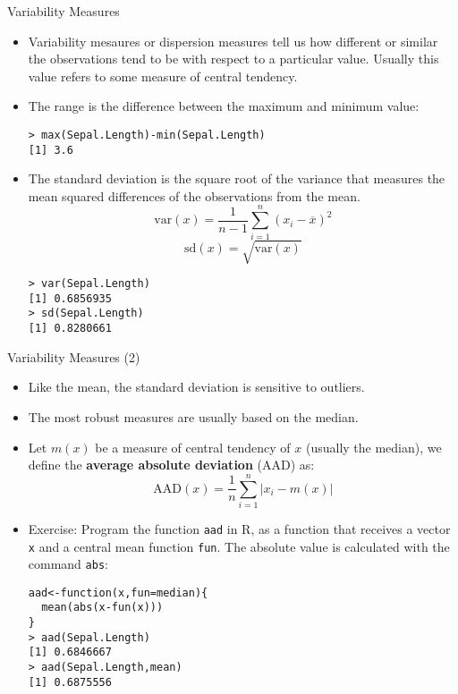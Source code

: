 \documentclass[handout]{beamer}
\begin{document}
\begin{frame}[fragile]{Variability Measures}
\scriptsize{ 
\begin{itemize}
 \item Variability mesaures or dispersion measures tell us how different or similar the observations tend to be with respect to a particular value. Usually this value refers to some measure of central tendency.
 \item  The range is the difference between the maximum and minimum value:
 \begin{verbatim}
> max(Sepal.Length)-min(Sepal.Length)
[1] 3.6
 \end{verbatim}
 \item The standard deviation is the square root of the variance that measures the mean squared differences of the observations from the mean.  
 \begin{displaymath}
  \text{var}(x)=\frac{1}{n-1}\sum_{i=1}^{n}(x_{i} - \overline{x} )^2
 \end{displaymath}
 \begin{displaymath}
  \text{sd}(x)=\sqrt{\text{var}(x)}
 \end{displaymath}

\begin{verbatim}
> var(Sepal.Length)
[1] 0.6856935
> sd(Sepal.Length)
[1] 0.8280661 
\end{verbatim}



\end{itemize}
 
 
 
} 
\end{frame}


\begin{frame}[fragile]{Variability Measures (2)}
\scriptsize{ 
\begin{itemize}
 \item Like the mean, the standard deviation is sensitive to outliers.
 \item The most robust measures are usually based on the median.

  \item Let $m(x)$ be a measure of central tendency of $x$ (usually the median), we define the \textbf{average absolute deviation} (AAD)  as:
  \begin{displaymath}
   \text{AAD}(x) = \frac{1}{n}\sum_{i=1}^{n}|x_i-m(x)| 
  \end{displaymath}
  
  \item Exercise: Program the function \verb+aad+ in R, as a function that receives a vector \verb+x+ and a central mean function \verb+fun+. The absolute value is calculated with the command \verb+abs+:
  
  \begin{verbatim}
aad<-function(x,fun=median){
  mean(abs(x-fun(x)))
}
> aad(Sepal.Length)
[1] 0.6846667
> aad(Sepal.Length,mean)
[1] 0.6875556
  \end{verbatim}


\end{itemize}
 
 
 
} 
\end{frame}
\end{document}
